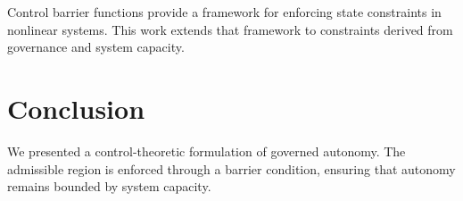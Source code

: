 \documentclass[letterpaper, 10 pt, conference]{ieeeconf}
\begin{document}
Control barrier functions provide a framework for enforcing state constraints in nonlinear systems. This work extends that framework to constraints derived from governance and system capacity.

\section{Conclusion}

We presented a control-theoretic formulation of governed autonomy. The admissible region is enforced through a barrier condition, ensuring that autonomy remains bounded by system capacity.
\end{document}

